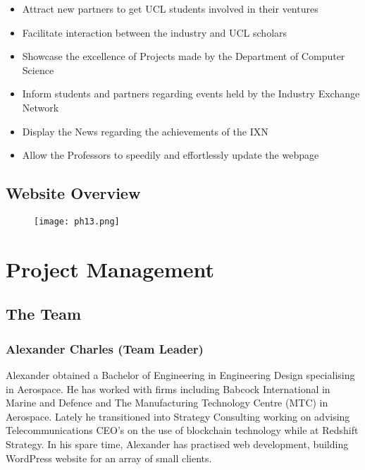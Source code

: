 \begin{itemize}
\item
  Attract new partners to get UCL students involved in their ventures
\item
  Facilitate interaction between the industry and UCL scholars
\item
  Showcase the excellence of Projects made by the Department of Computer
  Science
\item
  Inform students and partners regarding events held by the Industry
  Exchange Network
\item
  Display the News regarding the achievements of the IXN
\item
  Allow the Professors to speedily and effortlessly update the webpage
\end{itemize}

\hypertarget{website-overview}{%
\subsection{Website Overview}\label{website-overview}}

\begin{figure}[H]
      \centering
      \texttt{[image: ph13.png]}
 \end{figure}

\hypertarget{project-management}{%
\section{Project Management}\label{project-management}}

\hypertarget{the-team}{%
\subsection{The Team}\label{the-team}}

\hypertarget{alexander-charles-team-leader}{%
\subsubsection{Alexander Charles (Team
Leader)}\label{alexander-charles-team-leader}}

Alexander obtained a Bachelor of Engineering in Engineering Design
specialising in Aerospace. He has worked with firms including Babcock
International in Marine and Defence and The Manufacturing Technology
Centre (MTC) in Aerospace. Lately he transitioned into Strategy
Consulting working on advising Telecommunications CEO's on the use of
blockchain technology while at Redshift Strategy. In his spare time,
Alexander has practised web development, building WordPress website for
an array of small clients.


